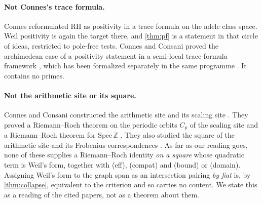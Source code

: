\documentclass[11pt]{article}
\theoremstyle{definition}
\newcommand{\Z}{\mathbb{Z}}
\begin{document}
\paragraph{Not Connes's trace formula.} Connes \cite{Connes99,ConnesEssay} reformulated RH as positivity in a trace formula on the adele class space. Weil positivity is again the target there, and \cref{thm:pf} is a statement in that circle of ideas, restricted to pole-free tests. Connes and Consani proved the archimedean case of a positivity statement in a semi-local trace-formula framework \cite{CCArch}, which has been formalized separately in the same programme \cite{RHLean}. It contains no primes.

\paragraph{Not the arithmetic site or its square.} Connes and Consani constructed the arithmetic site and its scaling site \cite{CCArith,CCScaling}. They proved a Riemann--Roch theorem on the periodic orbits $C_p$ of the scaling site \cite{CCScaling} and a Riemann--Roch theorem for $\overline{\mathrm{Spec}\,\Z}$ \cite{CCRR}. They also studied the square of the arithmetic site and its Frobenius correspondences \cite{CCArith}. As far as our reading goes, none of these supplies a Riemann--Roch identity \emph{on a square} whose quadratic term is Weil's form, together with (eff), (compat) and (bound) or (domain). Assigning Weil's form to the graph span as an intersection pairing \emph{by fiat} is, by \cref{thm:collapse}, equivalent to the criterion and so carries no content. We state this as a reading of the cited papers, not as a theorem about them.
\end{document}
